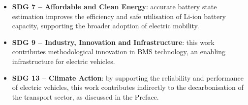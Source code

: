\begin{itemize}
    \item \textbf{SDG 7 -- Affordable and Clean Energy}: accurate battery state 
    estimation improves the efficiency and safe utilisation of \ac{Li-ion} 
    battery capacity, supporting the broader adoption of electric mobility.
    \item \textbf{SDG 9 -- Industry, Innovation and Infrastructure}: this work 
    contributes methodological innovation in \ac{BMS} technology, an enabling 
    infrastructure for electric vehicles.
    \item \textbf{SDG 13 -- Climate Action}: by supporting the reliability and 
    performance of electric vehicles, this work contributes indirectly to the 
    decarbonisation of the transport sector, as discussed in the 
    Preface.
\end{itemize}